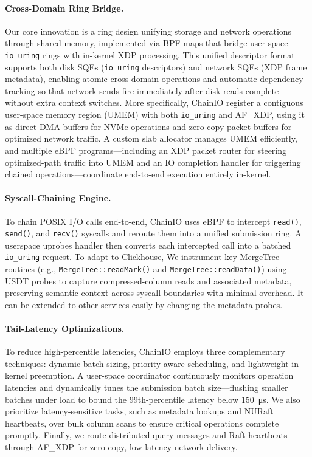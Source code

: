 \documentclass[sigconf,10pt]{acmart}
\newcommand{\sys}{ChainIO\xspace}
\begin{document}
\paragraph{Cross-Domain Ring Bridge.} Our core innovation is a ring design unifying storage and network operations through shared memory, implemented via BPF maps that bridge user-space \texttt{io\_uring} rings with in-kernel XDP processing. This unified descriptor format supports both disk SQEs (\texttt{io\_uring} descriptors) and network SQEs (XDP frame metadata), enabling atomic cross-domain operations and automatic dependency tracking so that network sends fire immediately after disk reads complete—without extra context switches. More specifically, \sys register a contiguous user-space memory region (UMEM) with both \texttt{io\_uring} and AF\_XDP, using it as direct DMA buffers for NVMe operations and zero-copy packet buffers for optimized network traffic. A custom slab allocator manages UMEM efficiently, and multiple eBPF programs—including an XDP packet router for steering optimized-path traffic into UMEM and an IO completion handler for triggering chained operations—coordinate end-to-end execution entirely in-kernel.


\paragraph{Syscall-Chaining Engine.} To chain POSIX I/O calls end-to-end, \sys uses eBPF to intercept \texttt{read()}, \texttt{send()}, and \texttt{recv()} syscalls and reroute them into a unified submission ring. A userspace uprobes\cite{zheng2023bpftime} handler then converts each intercepted call into a batched \texttt{io\_uring} request. To adapt to Clickhouse, We instrument key MergeTree routines (e.g., \texttt{MergeTree::readMark()} and \texttt{MergeTree::readData()}) using USDT probes to capture compressed-column reads and associated metadata, preserving semantic context across syscall boundaries with minimal overhead. It can be extended to other services  easily by changing the metadata probes.

\paragraph{Tail-Latency Optimizations.} To reduce high-percentile latencies, \sys employs three complementary techniques: dynamic batch sizing, priority-aware scheduling, and lightweight in-kernel preemption. A user-space coordinator continuously monitors operation latencies and dynamically tunes the submission batch size—flushing smaller batches under load to bound the 99th-percentile latency below \SI{150}{\micro\second}. We also prioritize latency-sensitive tasks, such as metadata lookups and NURaft heartbeats, over bulk column scans to ensure critical operations complete promptly. Finally, we route distributed query messages and Raft heartbeats through AF\_XDP for zero-copy, low-latency network delivery.
\end{document}
